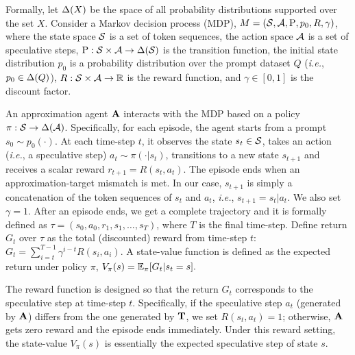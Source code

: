 Formally, let $\Delta(X)$ be the space of all probability distributions supported over the set $X$.
Consider a Markov decision process (MDP), $M=({\mathcal{S}}, {\mathcal{A}}, \mathrm{P}, p_0, R, \gamma)$, where the state space ${\mathcal{S}}$ is a set of token sequences, the action space ${\mathcal{A}}$ is a set of speculative steps, $\mathrm{P}: {\mathcal{S}} \times {\mathcal{A}} \rightarrow \Delta({\mathcal{S}})$ is the transition function, the initial state distribution $p_0$ is a probability distribution over the prompt dataset $Q$ (\emph{i.e.}, $p_0 \in \Delta(Q)$), $R: {\mathcal{S}} \times {\mathcal{A}} \rightarrow \mathbb{R}$ is the reward function, and $\gamma \in [0,1]$ is the discount factor.

An approximation agent ${\mathbf{A}}$ interacts with the MDP based on a policy $\pi: {\mathcal{S}} \rightarrow \Delta({\mathcal{A}})$. Specifically, for each episode, the agent starts from a prompt $s_0 \sim p_0(\cdot)$.
At each time-step $t$, it observes the state $s_t \in {\mathcal{S}}$, takes an action (\emph{i.e.}, a speculative step) $a_t \sim \pi(\cdot|s_t)$, transitions to a new state $s_{t+1}$ and receives a scalar reward $r_{t+1} = R(s_t, a_t)$.
The episode ends when an approximation-target mismatch is met.
In our case, $s_{t+1}$ is simply a concatenation of the token sequences of $s_t$ and $a_t$, \emph{i.e.}, $s_{t+1} = s_t | a_t$. We also set $\gamma=1$.
After an episode ends, we get a complete trajectory and it is formally defined as $\tau = (s_0, a_0, r_1, s_1, \dots, s_T)$, where $T$ is the final time-step. 
Define return $G_t$ over $\tau$ as the total (discounted) reward from time-step $t$: $G_t = \sum_{i=t}^{T-1} \gamma^{i-t} R(s_i, a_i).$
A state-value function is defined as the expected return under policy $\pi$, $V_{\pi}(s) = \mathbb{E}_{\pi}[G_t | s_t=s].$

The reward function is designed so that the return $G_t$ corresponds to the speculative step at time-step $t$.
Specifically, if the speculative step $a_t$ (generated by ${\mathbf{A}}$) differs from the one generated by ${\mathbf{T}}$, we set $R(s_t, a_t) = 1$; otherwise, ${\mathbf{A}}$ gets zero reward and the episode ends immediately.
Under this reward setting, the state-value $V_{\pi}(s)$ is essentially the expected speculative step of state $s$.

